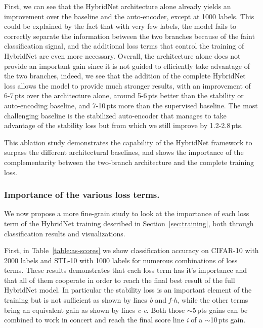 \documentclass[runningheads]{llncs}
\begin{document}
First, we can see that the HybridNet architecture alone already yields an improvement over the baseline and the auto-encoder, except at 1000 labels. This could be explained by the fact that with very few labels, the model fails to correctly separate the information between the two branches because of the faint classification signal, and the additional loss terms that control the training of HybridNet are even more necessary. Overall, the architecture alone does not provide an important gain since it is not guided to efficiently take advantage of the two branches, indeed, we see that the addition of the complete HybridNet loss allows the model to provide much stronger results, with an improvement of 6-7\,pts over the architecture alone, around 5-6\,pts better than the stability or auto-encoding baseline, and 7-10\,pts more than the supervised baseline. The most challenging baseline is the stabilized auto-encoder that manages to take advantage of the stability loss but from which we still improve by 1.2-2.8\,pts.

This ablation study demonstrates the capability of the HybridNet framework to surpass the different architectural baselines, and shows the importance of the complementarity between the two-branch architecture and the complete training loss.


\subsubsection{Importance of the various loss terms.} We now propose a more fine-grain study to look at the importance of each loss term of the HybridNet training described in Section~\ref{sec:training}, both through classification results and visualizations.

First, in Table~\ref{table:as-scores} we show classification accuracy on CIFAR-10 with 2000 labels and STL-10 with 1000 labels for numerous combinations of loss terms. These results demonstrates that each loss term has it's importance and that all of them cooperate in order to reach the final best result of the full HybridNet model. In particular the stability loss is an important element of the training but is not sufficient as shown by lines \textit{b} and \textit{f-h}, while the other terms bring an equivalent gain as shown by lines \textit{c-e}. Both those $\sim$5\,pts gains can be combined to work in concert and reach the final score line \textit{i} of a $\sim$10\,pts gain.
\end{document}
